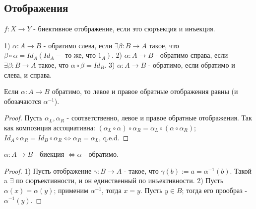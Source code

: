 \subsection{Отображения}

\begin{definition}
	$f: X \to Y$ - биективное отображение, если это сюръекция и инъекция.
\end{definition}

\begin{definition}
	1) $\alpha: A \to B$ - обратимо слева, если $\exists \beta: B \to A$ такое, что $\beta \circ \alpha = Id_A (Id_A - \text{ то же, что } 1_A).$
	2) $\alpha: A \to B$ - обратимо справа, если $\exists \beta: B \to A$ такое, что $\alpha \circ \beta = Id_B.$
	3) $\alpha: A \to B$ - обратимо, если обратимо и слева, и справа.
\end{definition}

\begin{lemma}
	Если $\alpha: A \to B$ обратимо, то левое и правое обратные отображения равны (и обозачаются $\alpha^{-1}$). 
\end{lemma}

\begin{proof}
	Пусть $\alpha_L, \alpha_R$ - соответственно, левое и правое обратные отображения. Так как композиция ассоциативна:
	$(\alpha_L \circ \alpha) \circ \alpha_R = \alpha_L \circ (\alpha \circ \alpha_R)$;
	$Id_A \circ \alpha_R = Id_B \circ \alpha_R \iff \alpha_R = \alpha_L$, q.e.d.
\end{proof}

\begin{proposition}
	$\alpha: A \to B$ - биекция $ \iff \alpha$ - обратимо.
\end{proposition}

\begin{proof}
	1) Пусть отображение $\gamma: B \to A$ - такое, что $\gamma(b) := a = \alpha^{-1}(b)$.
	Такой a $\exists$ по сюръективности, и он единственный по инъективности.
	2) Пусть $\alpha(x) = \alpha(y)$; применим $\alpha^{-1}$, тогда $x = y$. Пусть $y \in B$; тогда его прообраз - $\alpha^{-1}(y)$.
\end{proof}

